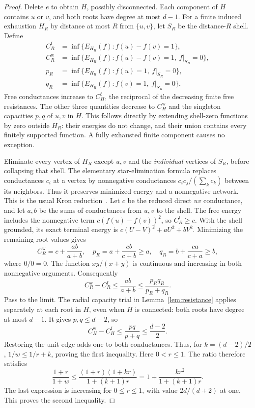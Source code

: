 \documentclass[11pt]{article}
\begin{document}
\begin{proof}
Delete $e$ to obtain $H$, possibly disconnected. Each component of $H$
contains $u$ or $v$, and both roots have degree at most $d-1$.
For a finite induced exhaustion $H_R$ by distance at most $R$ from
$\{u,v\}$, let $S_R$ be the distance-$R$ shell. Define
\begin{align*}
 C_R^{\mathrm f}&=\inf\{E_{H_R}(f):f(u)-f(v)=1\},\\
 C_R^{\mathrm w}&=\inf\{E_{H_R}(f):f(u)-f(v)=1,\ f|_{S_R}=0\},\\
 p_R&=\inf\{E_{H_R}(f):f(u)=1,\ f|_{S_R}=0\},\\
 q_R&=\inf\{E_{H_R}(f):f(v)=1,\ f|_{S_R}=0\}.
\end{align*}
Free conductances increase to $C_H^{\mathrm f}$, the reciprocal of
the decreasing finite free resistances. The other three quantities
decrease to $C_H^{\mathrm w}$ and the singleton capacities $p,q$ of
$u,v$ in $H$. This follows directly by extending shell-zero functions
by zero outside $H_R$: their energies do not change, and their union
contains every finitely supported function. A fully exhausted finite
component causes no exception.

Eliminate every vertex of $H_R$ except $u,v$ and the \emph{individual}
vertices of $S_R$, before collapsing that shell. The elementary
star-elimination formula replaces conductances $c_i$ at a vertex by
nonnegative conductances $c_ic_j/(\sum_kc_k)$ between its neighbors.
Thus it preserves minimized energy and a nonnegative network.
This is the usual Kron reduction~\cite{DorflerBullo}.
Let $c$ be the reduced direct $uv$ conductance, and let $a,b$ be the
sums of conductances from $u,v$ to the shell. The free energy includes
the nonnegative term $c(f(u)-f(v))^2$, so $C_R^{\mathrm f}\ge c$.
With the shell grounded, its exact terminal energy is
$c(U-V)^2+aU^2+bV^2$. Minimizing the remaining root values gives
\[
 C_R^{\mathrm w}=c+\frac{ab}{a+b},\quad
 p_R=a+\frac{cb}{c+b}\ge a,\quad
 q_R=b+\frac{ca}{c+a}\ge b,
\]
where $0/0=0$. The function $xy/(x+y)$ is continuous and increasing
in both nonnegative arguments. Consequently
\[
 C_R^{\mathrm w}-C_R^{\mathrm f}
       \le\frac{ab}{a+b}\le\frac{p_Rq_R}{p_R+q_R}.
\]
Pass to the limit. The radial capacity trial in
Lemma~\ref{lem:resistance} applies separately at each root in $H$,
even when $H$ is connected: both roots have degree at most $d-1$.
It gives $p,q\le d-2$, so
\begin{equation}\label{eq:escape-conductance}
 C_H^{\mathrm w}-C_H^{\mathrm f}
             \le\frac{pq}{p+q}\le\frac{d-2}{2}.
\end{equation}
Restoring the unit edge adds one to both conductances. Thus, for
$k=(d-2)/2$, $1/w\le1/r+k$, proving the first inequality.
Here $0<r\le1$. The ratio therefore satisfies
\[
 \frac{1+r}{1+w}\le
 \frac{(1+r)(1+kr)}{1+(k+1)r}
     =1+\frac{kr^2}{1+(k+1)r}.
\]
The last expression is increasing for $0\le r\le1$, with value
$2d/(d+2)$ at one. This proves the second inequality.
\end{proof}
\end{document}
